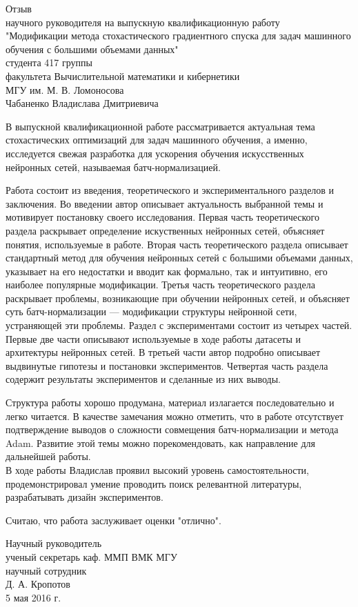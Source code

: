\documentclass[12pt,oneside]{article}
\begin{document}
\begin{center}
Отзыв\\
научного руководителя на выпускную квалификационную работу \\
"Модификации метода стохастического градиентного спуска для задач машинного обучения с большими объемами данных"\\
студента 417 группы \\
факультета Вычислительной математики и кибернетики\\
МГУ им. М. В. Ломоносова\\
Чабаненко Владислава Дмитриевича\\
\end{center}
\bigskip

\begin{flushleft}
В выпускной квалификационной работе рассматривается актуальная тема стохастических оптимизаций для задач машинного обучения, а именно, исследуется свежая разработка для ускорения обучения искусственных нейронных сетей, называемая батч-нормализацией. 

Работа состоит из введения, теоретического и экспериментального разделов и заключения. Во введении автор описывает актуальность выбранной темы и мотивирует постановку своего  исследования. Первая часть теоретического раздела раскрывает определение искуственных нейронных сетей, объясняет понятия, используемые в работе. Вторая часть теоретического раздела описывает стандартный метод для обучения нейронных сетей с большими объемами данных, указывает на его недостатки и вводит как формально, так и интуитивно, его наиболее популярные модификации. Третья часть теоретического раздела раскрывает проблемы, возникающие при обучении нейронных сетей, и объясняет суть батч-нормализации --- модификации структуры нейронной сети, устраняющей эти проблемы. Раздел с экспериментами состоит из четырех частей. Первые две части описывают используемые в ходе работы датасеты и архитектуры нейронных сетей. В третьей части автор подробно описывает выдвинутые гипотезы и постановки экспериментов. Четвертая часть раздела содержит результаты экспериментов и сделанные из них выводы. 

Структура работы хорошо продумана, материал излагается последовательно и легко читается. В качестве замечания можно отметить, что в работе отсутствует подтверждение выводов о сложности совмещения батч-нормализации и метода Adam. Развитие этой темы можно порекомендовать, как направление для дальнейшей работы.\\

В ходе работы Владислав проявил высокий уровень самостоятельности, продемонстрировал умение проводить поиск релевантной литературы, разрабатывать дизайн экспериментов.

Считаю, что работа заслуживает оценки "отлично".\\
\end{flushleft}


\begin{flushleft}
Научный руководитель\\
ученый секретарь каф. ММП ВМК МГУ\\
научный сотрудник\\
Д. А. Кропотов\\

5 мая 2016 г.
\end{flushleft}
\end{document}
